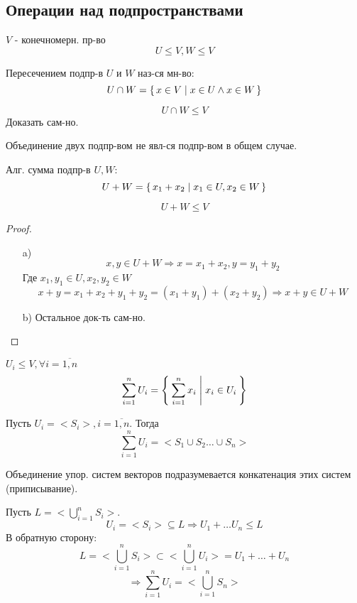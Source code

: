 \subsection{Операции над подпространствами}
$V$ - конечномерн. пр-во
\[
U \leq V, W \leq V
\]
\begin{definition}
Пересечением подпр-в $U$ и $W$ наз-ся мн-во:
\[
U \cap W = \set{x \in V | x \in U \land x \in W}
\]
\end{definition}
\begin{statement}
\[
U \cap W \leq V
\]
Доказать сам-но.
\end{statement}
\begin{note}
Объединение двух подпр-вом не явл-ся подпр-вом в общем случае.
\end{note}
\begin{definition}
Алг. сумма подпр-в $U, W$:
\[
U + W = \set{x_1 + x_2 | x_1 \in U, x_2 \in W}
\]
\end{definition}
\begin{statement}
\[
U + W \leq V
\]
\end{statement}
\begin{proof}
\begin{itemize}
  \item [a) ] \[
  x,y \in U + W \Rightarrow x = x_1 + x_2, y = y_1 + y_2
  \]
  Где $x_1, y_1 \in U, x_2, y_2 \in W$
  \[
  x + y = x_1 + x_2 + y_1 + y_2 = (x_1 + y_1) + (x_2 + y_2) \Rightarrow x + y \in U + W
  \]
\item [b) ] Остальное док-ть сам-но.
\end{itemize}
\end{proof}
\begin{definition}
  $U_i \leq V, \forall i = \overline{1, n}$
\[
  \sum_{i = 1}^{n} U_i = \Set{\sum_{i = 1}^{n} x_i | x_i \in U_i}
\]
\end{definition}
\begin{statement}
Пусть $U_i = <S_i>, i = \overline{1, n}$. Тогда
\[
  \sum_{i = 1}^{n} U_i = <S_1 \cup S_2 \ldots \cup S_n>
\]
\end{statement}
\begin{definition}
Объединение упор. систем векторов подразумевается конкатенация этих систем (приписывание).
\end{definition}
\begin{statement}
Пусть $L = <\bigcup_{i = 1}^{n} S_i>$.
\[
  U_i = <S_i> \subseteq L  \Rightarrow U_1 + \ldots U_n \leq L
\]
В обратную сторону:
\[
  L = <\bigcup_{i = 1}^{n} S_i> \subset <\bigcup_{i = 1}^{n} U_i> = U_1 + \ldots + U_n
\]
\[
\Rightarrow \sum_{i = 1}^{n} U_i = <\bigcup_{i = 1}^{n} S_n>
\]
\end{statement}
